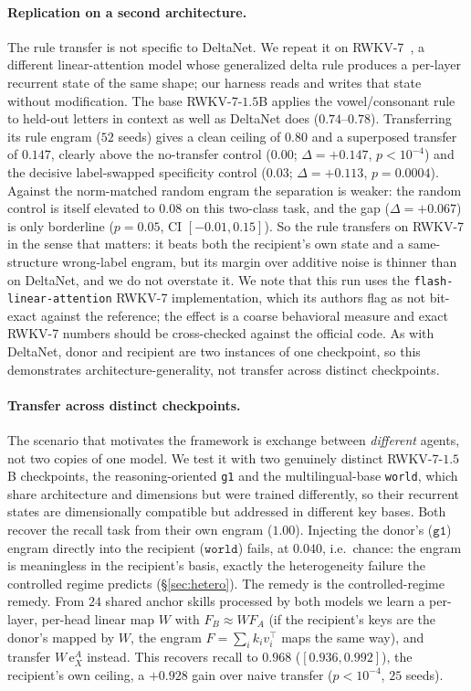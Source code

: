\documentclass[11pt]{article}
\theoremstyle{definition}
\begin{document}
\paragraph{Replication on a second architecture.}
The rule transfer is not specific to DeltaNet. We repeat it on RWKV-7~\cite{peng2025rwkv7}, a different linear-attention model whose generalized delta rule produces a per-layer recurrent state of the same shape; our harness reads and writes that state without modification. The base RWKV-7-$1.5$B applies the vowel/consonant rule to held-out letters in context as well as DeltaNet does ($0.74$--$0.78$). Transferring its rule engram ($52$ seeds) gives a clean ceiling of $0.80$ and a superposed transfer of $0.147$, clearly above the no-transfer control ($0.00$; $\Delta=+0.147$, $p<10^{-4}$) and the decisive label-swapped specificity control ($0.03$; $\Delta=+0.113$, $p=0.0004$). Against the norm-matched random engram the separation is weaker: the random control is itself elevated to $0.08$ on this two-class task, and the gap ($\Delta=+0.067$) is only borderline ($p=0.05$, CI $[-0.01,0.15]$). So the rule transfers on RWKV-7 in the sense that matters: it beats both the recipient's own state and a same-structure wrong-label engram, but its margin over additive noise is thinner than on DeltaNet, and we do not overstate it. We note that this run uses the \texttt{flash-linear-attention} RWKV-7 implementation, which its authors flag as not bit-exact against the reference; the effect is a coarse behavioral measure and exact RWKV-7 numbers should be cross-checked against the official code. As with DeltaNet, donor and recipient are two instances of one checkpoint, so this demonstrates architecture-generality, not transfer across distinct checkpoints.

\paragraph{Transfer across distinct checkpoints.}
The scenario that motivates the framework is exchange between \emph{different} agents, not two copies of one model. We test it with two genuinely distinct RWKV-7-$1.5$B checkpoints, the reasoning-oriented \texttt{g1} and the multilingual-base \texttt{world}, which share architecture and dimensions but were trained differently, so their recurrent states are dimensionally compatible but addressed in different key bases. Both recover the recall task from their own engram ($1.00$). Injecting the donor's ($\texttt{g1}$) engram directly into the recipient ($\texttt{world}$) fails, at $0.040$, i.e.\ chance: the engram is meaningless in the recipient's basis, exactly the heterogeneity failure the controlled regime predicts (\S\ref{sec:hetero}). The remedy is the controlled-regime remedy. From $24$ shared anchor skills processed by both models we learn a per-layer, per-head linear map $W$ with $F_B \approx W F_A$ (if the recipient's keys are the donor's mapped by $W$, the engram $F=\sum_i k_i v_i^\top$ maps the same way), and transfer $W\,\mathrm{e}_X^A$ instead. This recovers recall to $0.968$ ($[0.936,0.992]$), the recipient's own ceiling, a $+0.928$ gain over naive transfer ($p<10^{-4}$, $25$ seeds).
\end{document}
